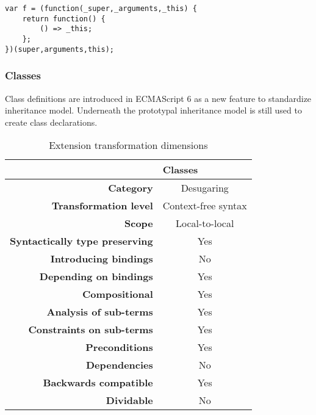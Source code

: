 \documentclass[10pt,a4paper]{article}
\begin{document}
\begin{lstlisting}[caption={Incorrect renaming of this in nested arrow function}]
var f = (function(_super,_arguments,_this) {
	return function() {	
		() => _this;
	};
})(super,arguments,this);
\end{lstlisting}

\subsubsection{Classes}
Class definitions\cite[14.5]{SpecJS} are introduced in ECMAScript 6 as a new feature to standardize inheritance model. Underneath the prototypal inheritance model is still used to create class declarations.
\begin{table}[h]
\centering
\caption{Extension transformation dimensions}
\label{classes-table}
\begin{tabular}{@{}rc@{}}
\toprule
                                       & \multicolumn{1}{l}{\textbf{Classes}} \\ \midrule
\textbf{Category}                      & Desugaring
\\ 
\textbf{Transformation level}          & Context-free syntax                          \\
\textbf{Scope}                         & Local-to-local                               \\
\textbf{Syntactically type preserving} & Yes                                          \\
\textbf{Introducing bindings}          & No                                          \\%
\textbf{Depending on bindings}         & Yes                                           \\
\textbf{Compositional}                 & Yes                                          \\
\textbf{Analysis of sub-terms}          & Yes                                          \\
\textbf{Constraints on sub-terms}       & Yes                                           \\
\textbf{Preconditions}                 & Yes                                          \\
\textbf{Dependencies}                  & No                                           \\
\textbf{Backwards compatible}          & Yes                                          \\
\textbf{Dividable}                     & No                                           \\ \bottomrule
\end{tabular}
\end{table}
\end{document}
